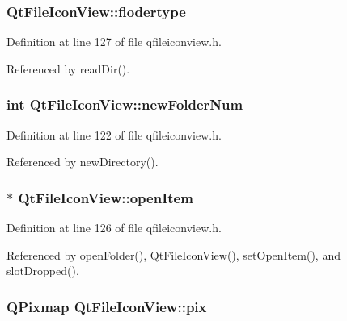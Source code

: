 \subsubsection{ {\bf Qt\-File\-Icon\-View::flodertype}\hspace{0.3cm}{\tt  [protected]}}\label{classQtFileIconView_QtFileIconViewp6}




Definition at line 127 of file qfileiconview.h.

Referenced by read\-Dir().
\subsubsection{\setlength{\rightskip}{0pt plus 5cm}int {\bf Qt\-File\-Icon\-View::new\-Folder\-Num}\hspace{0.3cm}{\tt  [protected]}}\label{classQtFileIconView_QtFileIconViewp1}




Definition at line 122 of file qfileiconview.h.

Referenced by new\-Directory().
\subsubsection{$\ast$ {\bf Qt\-File\-Icon\-View::open\-Item}\hspace{0.3cm}{\tt  [protected]}}\label{classQtFileIconView_QtFileIconViewp5}




Definition at line 126 of file qfileiconview.h.

Referenced by open\-Folder(), Qt\-File\-Icon\-View(), set\-Open\-Item(), and slot\-Dropped().
\subsubsection{\setlength{\rightskip}{0pt plus 5cm}QPixmap {\bf Qt\-File\-Icon\-View::pix}\hspace{0.3cm}{\tt  [protected]}}\label{classQtFileIconView_QtFileIconViewp3}




